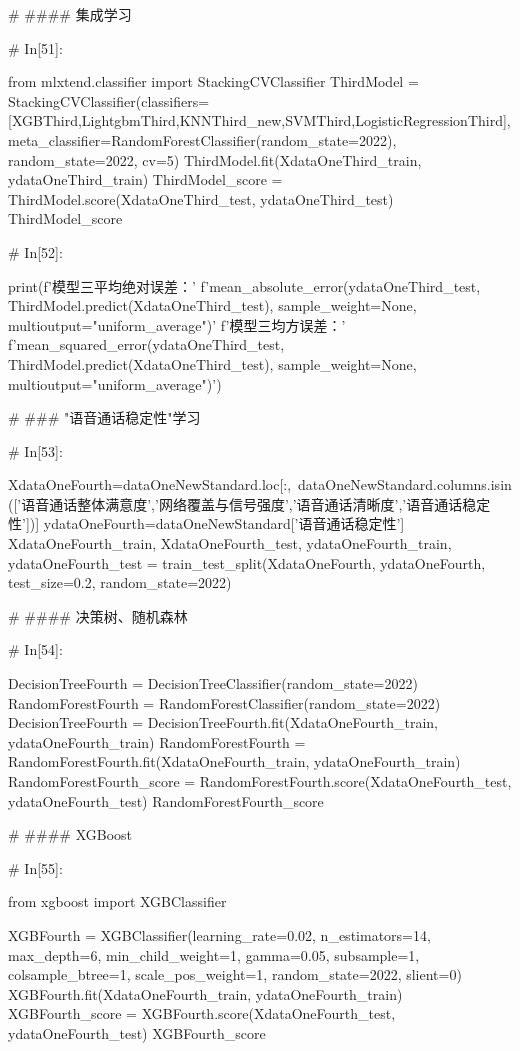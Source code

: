 \documentclass{MathorCupmodeling}
\begin{document}
\begin{python}
# #### 集成学习

# In[51]:


from mlxtend.classifier import StackingCVClassifier
ThirdModel = StackingCVClassifier(classifiers=[XGBThird,LightgbmThird,KNNThird_new,SVMThird,LogisticRegressionThird], meta_classifier=RandomForestClassifier(random_state=2022), random_state=2022, cv=5)
ThirdModel.fit(XdataOneThird_train, ydataOneThird_train)
ThirdModel_score = ThirdModel.score(XdataOneThird_test, ydataOneThird_test)
ThirdModel_score


# In[52]:


print(f'模型三平均绝对误差：'
      f'{mean_absolute_error(ydataOneThird_test, ThirdModel.predict(XdataOneThird_test), sample_weight=None, multioutput="uniform_average")}\n'
      f'模型三均方误差：'
      f'{mean_squared_error(ydataOneThird_test, ThirdModel.predict(XdataOneThird_test), sample_weight=None, multioutput="uniform_average")}')


# ### "语音通话稳定性"学习

# In[53]:


XdataOneFourth=dataOneNewStandard.loc[:,~dataOneNewStandard.columns.isin(['语音通话整体满意度','网络覆盖与信号强度','语音通话清晰度','语音通话稳定性'])]
ydataOneFourth=dataOneNewStandard['语音通话稳定性']
XdataOneFourth_train, XdataOneFourth_test, ydataOneFourth_train, ydataOneFourth_test = train_test_split(XdataOneFourth, ydataOneFourth, test_size=0.2, random_state=2022)


# #### 决策树、随机森林

# In[54]:


DecisionTreeFourth = DecisionTreeClassifier(random_state=2022)
RandomForestFourth = RandomForestClassifier(random_state=2022)
DecisionTreeFourth = DecisionTreeFourth.fit(XdataOneFourth_train, ydataOneFourth_train)
RandomForestFourth = RandomForestFourth.fit(XdataOneFourth_train, ydataOneFourth_train)
RandomForestFourth_score = RandomForestFourth.score(XdataOneFourth_test, ydataOneFourth_test)
RandomForestFourth_score


# #### XGBoost

# In[55]:


from xgboost import XGBClassifier

XGBFourth = XGBClassifier(learning_rate=0.02,
                          n_estimators=14,
                          max_depth=6,
                          min_child_weight=1,
                          gamma=0.05,
                          subsample=1,
                          colsample_btree=1,
                          scale_pos_weight=1,
                          random_state=2022,
                          slient=0)
XGBFourth.fit(XdataOneFourth_train, ydataOneFourth_train)
XGBFourth_score = XGBFourth.score(XdataOneFourth_test, ydataOneFourth_test)
XGBFourth_score



\end{python}
\end{document}
